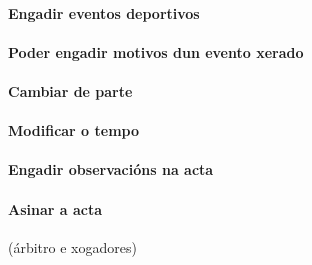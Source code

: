 \documentclass[a4paper,spanish,10p,titlepage]{report}
\begin{document}
    \paragraph{Engadir eventos deportivos}
    \paragraph{Poder engadir motivos dun evento xerado}
    \paragraph{Cambiar de parte}
    \paragraph{Modificar o tempo}
    \paragraph{Engadir observacións na acta}
    \paragraph{Asinar a acta} (árbitro e xogadores)
\end{document}
